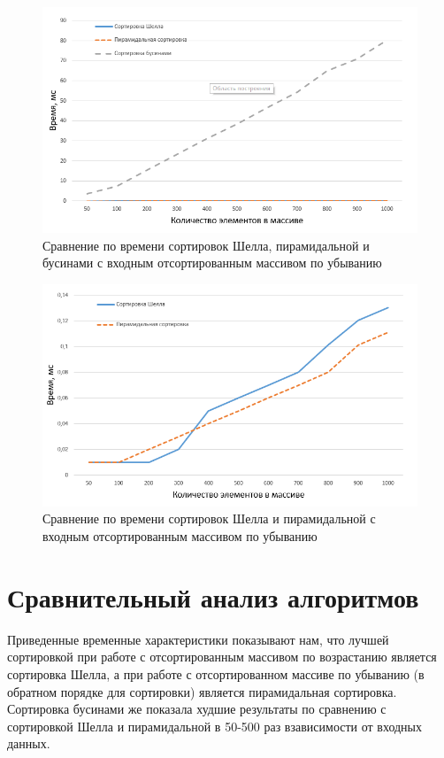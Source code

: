 \begin{figure}[h]
	\centering
	\includegraphics[height=0.3\textheight]{img/rsort_1.png}
	\caption{Сравнение по времени сортировок Шелла, пирамидальной и бусинами с входным отсортированным массивом по убыванию}
	\label{plt:rsort_1}
\end{figure}

\begin{figure}[h]
	\centering
	\includegraphics[height=0.3\textheight]{img/rsort_2.png}
	\caption{Сравнение по времени сортировок Шелла и пирамидальной с входным отсортированным массивом по убыванию}
	\label{plt:rsort_2}
\end{figure}

\clearpage

\section{Сравнительный анализ алгоритмов}
Приведенные временные характеристики показывают нам, что лучшей сортировкой при работе с отсортированным массивом по возрастанию является сортировка Шелла, а при работе с отсортированном массиве по убыванию (в обратном порядке для сортировки) является пирамидальная сортировка. Сортировка бусинами же показала худшие результаты по сравнению с сортировкой Шелла и пирамидальной в 50-500 раз взависимости от входных данных.

